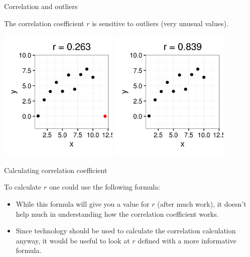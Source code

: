 \documentclass[xcolor=table, aspectratio=169, bigger, handout]{beamer}
\begin{document}
\begin{frame}{Correlation and outliers}
\begin{block}{}
The correlation coefficient $r$ is sensitive to outliers (very unusual values).
\end{block}
{\centering
\includegraphics[width=2.25in]{../images/ch10_cor_w_out}
\pause\includegraphics[width=2.25in]{../images/ch10_cor_wo_out}
\par}
\end{frame}

\begin{frame}{Calculating correlation coefficient}
\begin{block}{}
To calculate $r$ one could use the following formula:\\
\medskip
{}
\medskip
\begin{itemize}
\pause\item While this formula will give you a value for $r$ (after much work), it doesn't help much in understanding how the correlation coefficient works. 
\pause\item Since technology should be used to calculate the correlation calculation anyway, it would be useful to look at $r$ defined with a more informative formula.
\end{itemize}
\end{block}
\end{frame}
\end{document}
